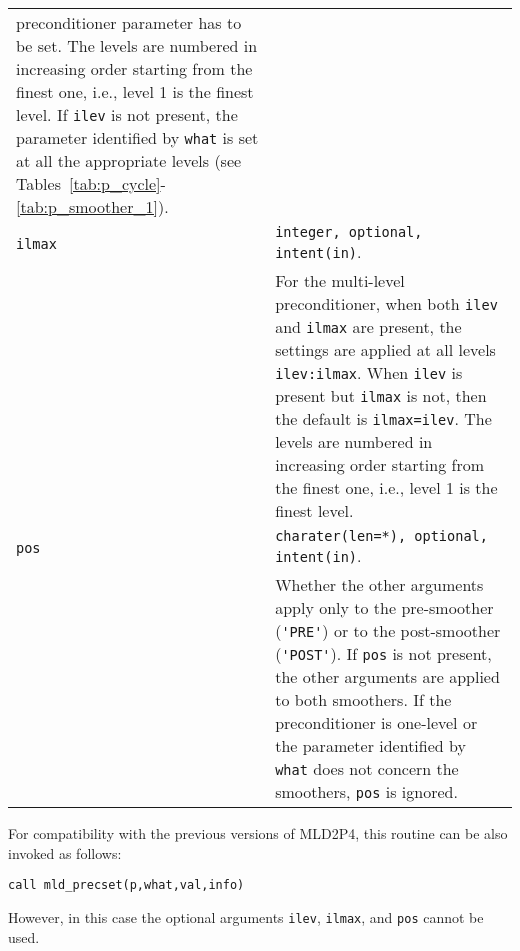 \begin{tabular}{p{1.2cm}p{12cm}}
                preconditioner parameter has to be set.
                The levels are numbered in increasing
                order starting from the finest one, i.e., level 1 is the finest level.
                If \verb|ilev| is not present, the parameter identified by \verb|what|
                is set at all the appropriate levels (see
                Tables~\ref{tab:p_cycle}-\ref{tab:p_smoother_1}).\\
\verb|ilmax|   & \verb|integer, optional, intent(in)|.\\
              & For the multi-level preconditioner, when both
                \verb|ilev| and \verb|ilmax| are present, the settings
                are applied at all levels \verb|ilev:ilmax|. When
                \verb|ilev| is present but \verb|ilmax| is not, then
                the default is \verb|ilmax=ilev|.
                The levels are numbered in increasing
                order starting from the finest one, i.e., level 1 is the finest level. \\
\verb|pos|   & \verb|charater(len=*), optional, intent(in)|.\\
              & Whether the other arguments apply only to the pre-smoother (\verb|'PRE'|)
                or to the post-smoother (\verb|'POST'|). If \verb|pos| is not present,
                the other arguments are applied to both smoothers.
                If the preconditioner is one-level or the parameter identified by \verb|what|
                does not concern the smoothers, \verb|pos| is ignored.
\end{tabular}

\baselineskip
For compatibility with the previous versions of MLD2P4, this routine can be also invoked
as follows:

\begin{center}
\verb|call mld_precset(p,what,val,info)|
\end{center}

\noindent
However, in this case the optional arguments \verb|ilev|, \verb|ilmax|, and \verb|pos|
cannot be used. \\

